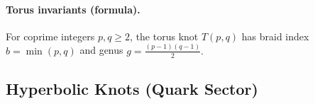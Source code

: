 \documentclass[10pt,reprint,aps,onecolumn,nofootinbib]{revtex4-2}
\begin{document}
            \paragraph{Torus invariants (formula).}
                For coprime integers $p,q\ge 2$, the torus knot $T(p,q)$ has braid index
                $b=\min(p,q)$ and genus
                \(
                g=\frac{(p-1)(q-1)}{2}.
                \)

    \subsection*{Hyperbolic Knots (Quark Sector)}

        \begin{table}[H]
            \centering
            \footnotesize
            \setlength{\tabcolsep}{3pt}
            \renewcommand{\arraystretch}{0.9}

            \caption{Hyperbolic knots (quark sector) with SST symmetry data.}
            \label{tab:hyperbolic-quark}


\end{table}
\end{document}
